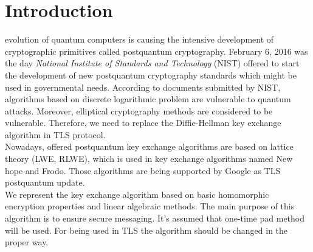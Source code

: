 \section{Introduction}
	\IEEEoverridecommandlockouts{} evolution of quantum computers is causing the intensive development of cryptographic primitives called postquantum cryptography. February 6, 2016 was the day \textit{National Institute of Standards and Technology} (NIST) offered to start the development of new postquantum cryptography standards which might be used in governmental needs. According to documents submitted by NIST, algorithms based on discrete logarithmic problem are vulnerable to quantum attacks. Moreover, elliptical cryptography methods are considered to be vulnerable. Therefore, we need to replace the Diffie-Hellman key exchange algorithm in TLS protocol. \\ 
Nowadays, offered postquantum key exchange algorithms are based on lattice theory (LWE, RLWE), which is used in key exchange algorithms named New hope and Frodo. Those algorithms are being supported by Google as TLS postquantum update. \\
We represent the key exchange algorithm based on basic homomorphic encryption properties and linear algebraic methods. The main purpose of this algorithm is to ensure secure messaging. It's assumed that one-time pad method will be used. For being used in TLS the algorithm should be changed in the proper way. 